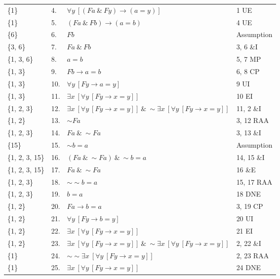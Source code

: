 \documentclass[a4paper,12pt]{article}
\newcommand{\ra}{\rightarrow}
\newcommand{\s}{\sim}
\newcommand{\ta}{ \ \& \ }
\newcommand{\all}{\forall}
\newcommand{\ex}{\exists}
\begin{document}
\begin{enumerate}[label=\arabic*,leftmargin=*]
\begin{enumerate}[label=\arabic*.,start=10]
\begin{minipage}{\textwidth}
\begin{tabular}{l l l l}
                        \{1\}           &  4. & $\all y \ [(Fa \ta Fy) \ra (a=y)]$ & 1 UE\\
                        \{1\}           &  5. & $(Fa \ta Fb) \ra (a=b)$ & 4 UE\\
                        \{6\}           &  6. & $Fb$ & Assumption\\
                        \{3, 6\}        &  7. & $Fa \ta Fb$ & 3, 6 \&I\\
                        \{1, 3, 6\}     &  8. & $a=b$ & 5, 7 MP\\
                        \{1, 3\}        &  9. & $Fb \ra a=b$ & 6, 8 CP\\
                        \{1, 3\}        & 10. & $\all y \ [Fy \ra a=y]$ & 9 UI\\
                        \{1, 3\}        & 11. & $\ex x \ [\all y \ [Fy \ra x=y]]$ & 10 EI\\
                        \{1, 2, 3\}     & 12. & $\ex x \ [\all y \ [Fy \ra x=y]] \ta \s \ex x \ [\all y \ [Fy \ra x=y]]$ & 11, 2 \&I\\
                        \{1, 2\}        & 13. & $\s Fa$ & 3, 12 RAA\\
                        \{1, 2, 3\}     & 14. & $Fa \ta \s Fa$ & 3, 13 \&I\\
                        \{15\}          & 15. & $\s b=a$ & Assumption\\
                        \{1, 2, 3, 15\} & 16. & $(Fa \ta \s Fa) \ta \s b=a$ & 14, 15 \&I\\
                        \{1, 2, 3, 15\} & 17. & $Fa \ta \s Fa$ & 16 \&E\\
                        \{1, 2, 3\}     & 18. & $\s \s b=a$ & 15, 17 RAA\\
                        \{1, 2, 3\}     & 19. & $b=a$ & 18 DNE\\
                        \{1, 2\}        & 20. & $Fa \ra b=a$ & 3, 19 CP\\
                        \{1, 2\}        & 21. & $\all y \ [Fy \ra b=y]$ & 20 UI\\
                        \{1, 2\}        & 22. & $\ex x \ [\all y \ [Fy \ra x=y]]$ & 21 EI\\
                        \{1, 2\}        & 23. & $\ex x \ [\all y \ [Fy \ra x=y]] \ta \s \ex x \ [\all y \ [Fy \ra x=y]]$ & 2, 22 \&I\\
                        \{1\}           & 24. & $\s \s \ex x \ [\all y \ [Fy \ra x=y]]$ & 2, 23 RAA\\
                        \{1\}           & 25. & $\ex x \ [\all y \ [Fy \ra x=y]]$ & 24 DNE\\
                    \end{tabular}
                    \vspace{1em}
                \end{minipage}
            \end{enumerate}

    \end{enumerate}
\end{document}
